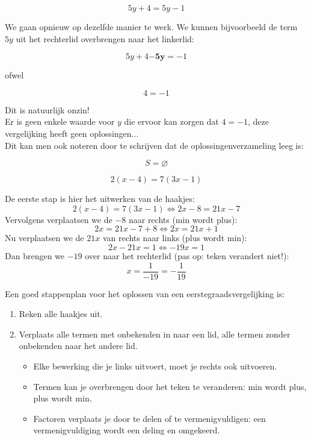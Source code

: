 \begin{voorbeeld}

\[ 5y+4=5y-1  \]

We gaan opnieuw op dezelfde manier te werk. We kunnen bijvoorbeeld de term $5y$ uit het rechterlid overbrengen naar het linkerlid:

\[ 5y+4 \boldsymbol{-5y} = -1 \]

ofwel

\[ 4 = -1 \]

Dit is natuurlijk onzin!\\
Er is geen enkele waarde voor $y$ die ervoor kan zorgen dat $4=-1$, deze vergelijking heeft geen oplossingen...\\
Dit kan men ook noteren door te schrijven dat de oplossingenverzameling leeg is:

\[ S=\varnothing \]

\end{voorbeeld}

\begin{voorbeeld}

\[2(x-4)=7(3x-1)\]

De eerste stap is hier het uitwerken van de haakjes:
\[2(x-4)=7(3x-1) \Leftrightarrow 2x-8=21x-7\]
Vervolgens verplaatsen we de $-8$ naar rechts (min wordt plus):
\[2x=21x-7+8\Leftrightarrow 2x=21x+1\]
Nu verplaatsen we de $21x$ van rechts naar links (plus wordt min):
\[2x-21x=1\Leftrightarrow -19x=1\]
Dan brengen we $-19$ over naar het rechterlid (pas op: teken verandert niet!):
\[x=\frac{1}{-19}=-\frac{1}{19}\]

\end{voorbeeld}

\begin{ftonthoud}
	
Een goed stappenplan voor het oplossen van een eerstegraadsvergelijking is:
\begin{enumerate}
	\item Reken alle haakjes uit.
	\item Verplaats alle termen met onbekenden in naar een lid, alle termen zonder onbekenden naar het andere lid.
	       \begin{itemize}
                \item Elke bewerking die je links uitvoert, moet je rechts ook uitvoeren. \item Termen kan je overbrengen door het teken te veranderen: min wordt plus, plus wordt min. \item Factoren verplaats je door te delen of te vermenigvuldigen: een vermenigvuldiging wordt een deling en omgekeerd.
           \end{itemize}
\end{enumerate}
\end{ftonthoud}

